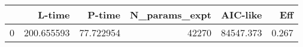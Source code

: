 \begin{tabular}{lrrrrr}
\toprule
{} &      L-time &     P-time &  N\_params\_expt &   AIC-like &    Eff \\
\midrule
0 &  200.655593 &  77.722954 &          42270 &  84547.373 &  0.267 \\
\bottomrule
\end{tabular}
